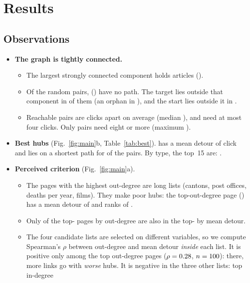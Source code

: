 \documentclass[10pt,a4paper]{article}
\begin{document}
\section{Results}
\subsection{Observations}
\begin{itemize}
\item \textbf{The graph is tightly connected.}
  \begin{itemize}
  \item The largest strongly connected component holds \LsccSize{} articles (\LsccShare).
  \item Of the random pairs, \NUnreachable{} (\ShareUnreachable) have no path. The target lies
    outside that component in \NUnreachTOutside{} of them (an orphan in \NUnreachTOrphan), and
    the start lies outside it in \NUnreachSOutside.
  \item Reachable pairs are \MeanDist{} clicks apart on average (median \MedianDist), and
    \ShareDistLeFour{} need at most four clicks. Only \NDistGeEight{} pairs need eight or more
    (maximum \MaxDistSample).
  \end{itemize}
\item \textbf{Best hubs} (Fig.~\ref{fig:main}b, Table~\ref{tab:best}). \BestHub{} has a mean detour
  of \BestHubDetour{} click and lies on a shortest path for \BestHubOnPath{} of the pairs.
  By type, the top~15 are: \TopFifteenTypes{}.
\item \textbf{Perceived criterion} (Fig.~\ref{fig:main}a).
  \begin{itemize}
  \item The pages with the highest out-degree are long lists (cantons, post offices, deaths per
    year, films). They make poor hubs: the top-out-degree page
    (\emph{\TopOutHub}) has a mean detour of \TopOutHubDetour{} and ranks \TopOutHubRank{} of
    \NCandidates.
  \item Only \TopOverlapOutDetour{} of the top-\TopOverlapK{} pages by out-degree are also in the
    top-\TopOverlapK{} by mean detour.
  \item The four candidate lists are selected on different variables, so we compute Spearman's
    $\rho$ between out-degree and mean detour \emph{inside} each list. It is positive only among
    the top out-degree pages ($\rho=0.28$, $n=100$): there,
    more links go with \emph{worse} hubs. It is negative in the three other lists: top in-degree

\end{itemize}
\end{itemize}
\end{document}
